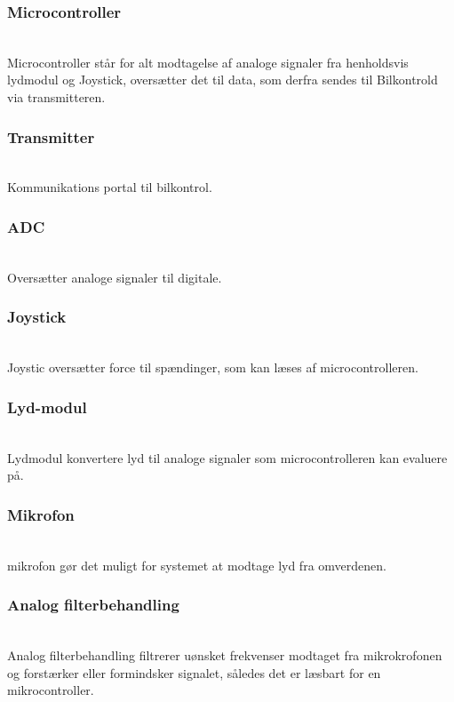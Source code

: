 \subsubsection*{\textbf{Microcontroller}}\hfill\\
Microcontroller står for alt modtagelse af analoge signaler fra henholdsvis lydmodul og Joystick, oversætter det til data, som derfra sendes til Bilkontrold via transmitteren.
\subsubsection*{\textbf{Transmitter}}\hfill\\
Kommunikations portal til bilkontrol.
\subsubsection*{\textbf{ADC}}\hfill\\
Oversætter analoge signaler til digitale.
\subsubsection*{\textbf{Joystick}}\hfill\\
Joystic oversætter force til spændinger, som kan læses af microcontrolleren.
\subsubsection*{\textbf{Lyd-modul}}\hfill\\
Lydmodul konvertere lyd til analoge signaler som microcontrolleren kan evaluere på.
\subsubsection*{\textbf{Mikrofon}}\hfill\\
mikrofon gør det muligt for systemet at modtage lyd fra omverdenen.
\subsubsection*{\textbf{Analog filterbehandling}}\hfill\\
Analog filterbehandling filtrerer uønsket frekvenser modtaget fra mikrokrofonen og forstærker eller formindsker signalet, således det er læsbart for en mikrocontroller.


